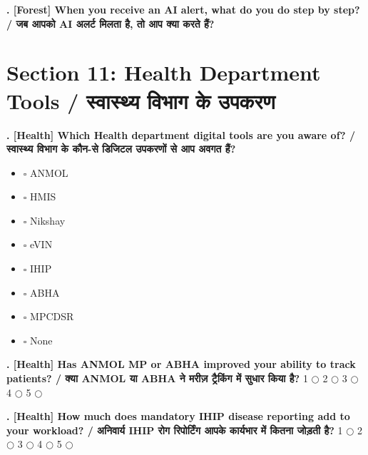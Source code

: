 \documentclass[11pt,a4paper]{article}
\newcounter{qcounter}
\begin{document}
\textbf{. [Forest] When you receive an AI alert, what do you do step by step? / जब आपको AI अलर्ट मिलता है, तो आप क्या करते हैं?}
\vspace{0.1cm}
\vspace{0.2cm}
\hrulefill\par\vspace{0.6cm}\hrulefill\par\vspace{0.6cm}\hrulefill
\vspace{0.4cm}


\section*{Section 11: Health Department Tools / स्वास्थ्य विभाग के उपकरण}
\vspace{0.2cm}
\textbf{. [Health] Which Health department digital tools are you aware of? / स्वास्थ्य विभाग के कौन-से डिजिटल उपकरणों से आप अवगत हैं?}
\vspace{0.1cm}
\begin{itemize}[label=, itemsep=0.1cm, leftmargin=0.5cm]
    \item $\square$ ANMOL
    \item $\square$ HMIS
    \item $\square$ Nikshay
    \item $\square$ eVIN
    \item $\square$ IHIP
    \item $\square$ ABHA
    \item $\square$ MPCDSR
    \item $\square$ None
\end{itemize}
\vspace{0.2cm}

\textbf{. [Health] Has ANMOL MP or ABHA improved your ability to track patients? / क्या ANMOL या ABHA ने मरीज़ ट्रैकिंग में सुधार किया है?}
\vspace{0.1cm}
\vspace{0.1cm}
1 $\bigcirc$ \hspace{1cm} 2 $\bigcirc$ \hspace{1cm} 3 $\bigcirc$ \hspace{1cm} 4 $\bigcirc$ \hspace{1cm} 5 $\bigcirc$
\vspace{0.4cm}

\textbf{. [Health] How much does mandatory IHIP disease reporting add to your workload? / अनिवार्य IHIP रोग रिपोर्टिंग आपके कार्यभार में कितना जोड़ती है?}
\vspace{0.1cm}
\vspace{0.1cm}
1 $\bigcirc$ \hspace{1cm} 2 $\bigcirc$ \hspace{1cm} 3 $\bigcirc$ \hspace{1cm} 4 $\bigcirc$ \hspace{1cm} 5 $\bigcirc$
\vspace{0.4cm}
\end{document}
